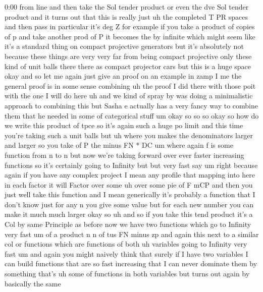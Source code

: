 \begin{unfinished}{0:00}
from  line  and  then  take  the  Sol  tender
product  or  even  the  dve  Sol  tender
product  and  it  turns  out  that  this  is
really  just
uh  the  completed  T  PR  spaces  and  then
pass  in  particular  it's  deg
Z  for  example  if  you  take  a  product  of
copies  of
p  and  take  another  prod  of
P  it  becomes  the  by
infinite  which  might  seem  like  it's  a
standard  thing  on  compact  projective
generators  but  it's  absolutely  not
because  these  things  are  very  very  far
from  being  compact  projective  only  these
kind  of  unit  balls  there  there  as
compact  projector  cars  but  this  is  a
huge
space
okay  and  so  let  me  again  just  give  an
proof  on  an  example
in
zamp  I  me  the  general  proof  is  in  some
sense  combining  uh  the  proof  I  did  there
with  those  poit  with  the  one  I  will  do
here  uh  and  we  kind  of  spray  by  was
doing  a  minimalistic  approach  to
combining  this  but  Sasha  e  actually  has
a  very  fancy  way  to  combine  them  that  he
needed  in  some  of  categorical  stuff  um
okay  so  so  so  okay
so  how  do  we  write  this  product  of  tpce
so  it's  again  such  a  huge  po
limit  and  this
time  you're  taking  such  a  unit  balls  but
uh  where  you  makes  the  denominators
larger  and  larger  so  you  take  of  P  the
minus  FN  *
DC
um  where  again  f  is  some  function  from  n
to  n
but  now  we're  taking  forward  over  ever
faster  increasing  functions  so  it's
certainly  going  to  Infinity  but  but  very
fast
say
um  right  because  again  if  you  have  any
complex  project  I  mean  any  profile  that
mapping  into  here  in  each  factor  it  will
Factor  over  some  uh  over  some  pie  of  F
mCP  and  then  you  just  well  take  this
function  and  I  mean  generically  it's
probably  a  function  that  I  don't  know
just  for  any  n  you  give  some  value  but
for  each  new  number  you  can  make  it  much
much
larger  okay  so  uh  and  so  if  you  take
this  tend
product  it's  a
Col  by  same  Principle  as  before  now  we
have  two
functions  which  go  to  Infinity  very  fast
um  of  a
product  n  n  of
tus  FN
minus
zp  and  again  this  next  to  a  similar
col  or  functions  which  are  functions  of
both
uh  variables  going  to  Infinity  very  fast
um
and  again  you  might  naively  think  that
surely  if  I  have  two  variables  I  can
build  functions  that  are  so  fast
increasing  that  I  can  never  dominate
them  by  something  that's  uh  some  of
functions  in  both  variables  but
turns  out  again  by  basically  the  same

\end{unfinished}
